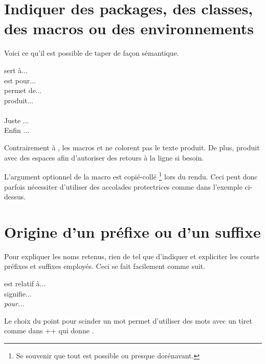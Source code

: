 \documentclass{../main/main}
\begin{document}
\section{Indiquer des packages, des classes, des macros ou des environnements}

Voici ce qu'il est possible de taper de façon sémantique.


\begin{tdoclatex}[sbs]
 sert à...           \\
 est pour...      \\
 permet de...      \\
 produit...               \\
          \\
Juste ...                \\
Enfin ...
\end{tdoclatex}


\begin{tdocrem}
    Contrairement à , les macros  et  ne colorent pas le texte produit.
    De plus,  produit  avec des espaces afin d'autoriser des retours à la ligne si besoin.
\end{tdocrem}


\begin{tdocwarn}
    L'argument optionnel de la macro  est copié-collé
    \footnote{
        Se souvenir que tout est possible ou presque dorénavant.
    }
    lors du rendu. Ceci peut donc parfois nécessiter d'utiliser des accolades protectrices comme dans l'exemple ci-dessus.
\end{tdocwarn}



\section{Origine d'un préfixe ou d'un suffixe}

Pour expliquer les noms retenus, rien de tel que d'indiquer et expliciter les courts préfixes et suffixes employés. Ceci se fait facilement comme suit.


\begin{tdoclatex}[sbs]
 est relatif à...    \\
 signifie... \\
\emph{ pour...}
\end{tdoclatex}


\begin{tdocrem}
    Le choix du point pour scinder un mot permet d'utiliser des mots avec un tiret comme dans \tdoclatexin++ qui donne .
\end{tdocrem}
\end{document}
